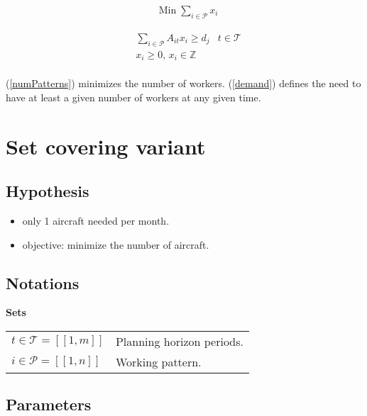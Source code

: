 \documentclass[a4paper,11pt]{article}
\begin{document}
    \begin{align}
        & \text{Min}\; \sum_{i \in \mathcal{P}} x_i \label{numPatterns}
    \end{align}

    \begin{align}
        & \sum_{i \in \mathcal{P}} A_{it}x_{i} \geq d_j & t \in \mathcal{T} \label{demand} \\
        & x_{i} \geq 0,\, x_{i} \in \mathbb{Z} \\
    \end{align}

    (\ref{numPatterns}) minimizes the number of workers. (\ref{demand}) defines the need to have at least a given number of workers at any given time.  

\clearpage

\section{Set covering variant}

    \subsection{Hypothesis}

    \begin{itemize}
     \item only 1 aircraft needed per month.
     \item objective: minimize the number of aircraft.
    \end{itemize}

    \subsection{Notations}

    \textbf{Sets}

    \begin{tabular}{ll}
    $t\in \mathcal{T} = [\![1, m]\!]$ & Planning horizon periods. \\
    $i \in \mathcal{P} = [\![1, n]\!]$ & Working pattern.\\
    \end{tabular}

    \vskip 0.3cm

    \subsection{Parameters}
\end{document}
